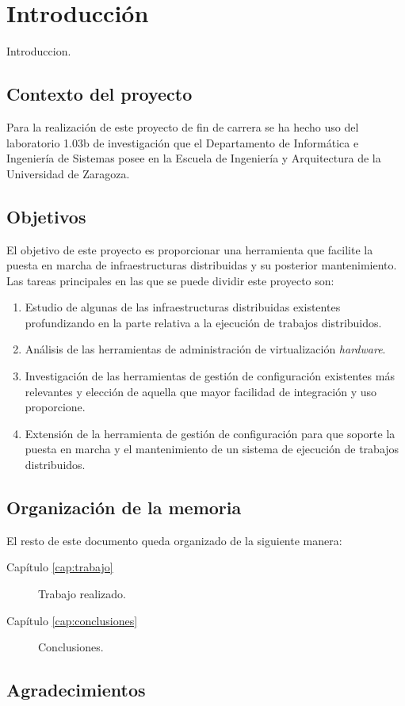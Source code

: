 \chapter{Introducción}
\label{cap:introduccion}

{\sf

Introduccion.

\section{Contexto del proyecto}

Para la realización de este proyecto de fin de carrera se ha hecho uso del laboratorio 1.03b de investigación que el Departamento de Informática e Ingeniería de Sistemas posee en la Escuela de Ingeniería y Arquitectura de la Universidad de Zaragoza.

\section{Objetivos}

El objetivo de este proyecto es proporcionar una herramienta que facilite la puesta en marcha de infraestructuras distribuidas y su posterior mantenimiento. Las tareas principales en las que se puede dividir este proyecto son:

\begin{enumerate}
\item Estudio de algunas de las infraestructuras distribuidas existentes profundizando en la parte relativa a la ejecución de trabajos distribuidos.
\item Análisis de las herramientas de administración de virtualización \emph{hardware}.
\item Investigación de las herramientas de gestión de configuración existentes más relevantes y elección de aquella que mayor facilidad de integración y uso proporcione.
\item Extensión de la herramienta de gestión de configuración para que soporte la puesta en marcha y el mantenimiento de un sistema de ejecución de trabajos distribuidos.
\end{enumerate}

\section{Organización de la memoria}

El resto de este documento queda organizado de la siguiente manera:
\begin{description}
\item[Capítulo \ref{cap:trabajo}] Trabajo realizado.
\item[Capítulo \ref{cap:conclusiones}] Conclusiones.
\end{description}


\section{Agradecimientos}

}
